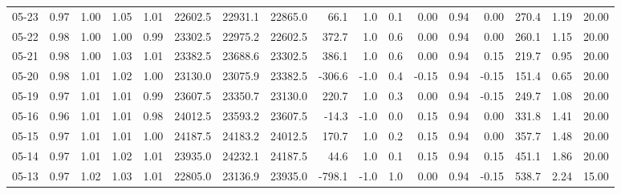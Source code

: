 \begin{threeparttable}
{\begin{tabular}{lrrrrrrrrrrrrrrrr}
  05-23 &         0.97 &           1.00 &          1.05 &          1.01 & 22602.5 & 22931.1 & 22865.0 &       66.1 &                      1.0 &                 0.1 &       0.00 &      0.94 &           0.00 &            270.4 &            1.19 &                  20.00 \\
  05-22 &         0.98 &           1.00 &          1.00 &          0.99 & 23302.5 & 22975.2 & 22602.5 &      372.7 &                      1.0 &                 0.6 &       0.00 &      0.94 &           0.00 &            260.1 &            1.15 &                  20.00 \\
  05-21 &         0.98 &           1.00 &          1.03 &          1.01 & 23382.5 & 23688.6 & 23302.5 &      386.1 &                      1.0 &                 0.6 &       0.00 &      0.94 &           0.15 &            219.7 &            0.95 &                  20.00 \\
  05-20 &         0.98 &           1.01 &          1.02 &          1.00 & 23130.0 & 23075.9 & 23382.5 &     -306.6 &                     -1.0 &                 0.4 &      -0.15 &      0.94 &          -0.15 &            151.4 &            0.65 &                  20.00 \\
  05-19 &         0.97 &           1.01 &          1.01 &          0.99 & 23607.5 & 23350.7 & 23130.0 &      220.7 &                      1.0 &                 0.3 &       0.00 &      0.94 &          -0.15 &            249.7 &            1.08 &                  20.00 \\
  05-16 &         0.96 &           1.01 &          1.01 &          0.98 & 24012.5 & 23593.2 & 23607.5 &      -14.3 &                     -1.0 &                 0.0 &       0.15 &      0.94 &           0.00 &            331.8 &            1.41 &                  20.00 \\
  05-15 &         0.97 &           1.01 &          1.01 &          1.00 & 24187.5 & 24183.2 & 24012.5 &      170.7 &                      1.0 &                 0.2 &       0.15 &      0.94 &           0.00 &            357.7 &            1.48 &                  20.00 \\
  05-14 &         0.97 &           1.01 &          1.02 &          1.01 & 23935.0 & 24232.1 & 24187.5 &       44.6 &                      1.0 &                 0.1 &       0.15 &      0.94 &           0.15 &            451.1 &            1.86 &                  20.00 \\
  05-13 &         0.97 &           1.02 &          1.03 &          1.01 & 22805.0 & 23136.9 & 23935.0 &     -798.1 &                     -1.0 &                 1.0 &       0.00 &      0.94 &          -0.15 &            538.7 &            2.24 &                  15.00 \\

\end{tabular}}
\end{threeparttable}
